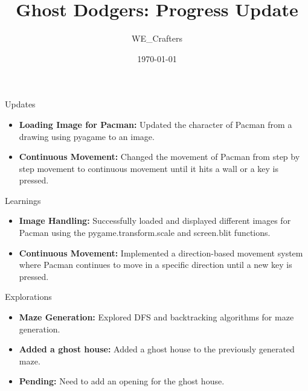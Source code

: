 \documentclass{beamer}
\title{Ghost Dodgers: Progress Update}
\author{WE\_Crafters}
\date{\today}
\begin{document}
\begin{frame}
  \titlepage
\end{frame}

\begin{frame}{Updates}
	\begin{itemize}
		\item \textbf{Loading Image for Pacman:} Updated the character of Pacman from a drawing using pyagame to an image.
		\item \textbf{Continuous Movement:} Changed the movement of Pacman from step by step movement to continuous movement until it hits a wall or a key is pressed.
	\end{itemize}
\end{frame}

\begin{frame}{Learnings}
	\begin{itemize}
		\item \textbf{Image Handling:} Successfully loaded and displayed different images for Pacman using the pygame.transform.scale and screen.blit functions.
		\item \textbf{Continuous Movement:} Implemented a direction-based movement system where Pacman continues to move in a specific direction until a new key is pressed.
	\end{itemize}
\end{frame}

\begin{frame}{Explorations}
	\begin{itemize}
		\item \textbf{Maze Generation:} Explored DFS and backtracking algorithms for maze generation.
		\item \textbf{Added a ghost house:} Added a ghost house to the previously generated maze.
		\item \textbf{Pending:} Need to add an opening for the ghost house.
	\end{itemize}
\end{frame}
\end{document}

